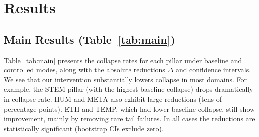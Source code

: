 \documentclass{article}
\begin{document}
\section{Results}
\subsection{Main Results (Table~\ref{tab:main})}
Table~\ref{tab:main} presents the collapse rates for each pillar under baseline and controlled modes, along with the absolute reductions $\Delta$ and confidence intervals. We see that our intervention substantially lowers collapse in most domains. For example, the STEM pillar (with the highest baseline collapse) drops dramatically in collapse rate. HUM and META also exhibit large reductions (tens of percentage points). ETH and TEMP, which had lower baseline collapse, still show improvement, mainly by removing rare tail failures. In all cases the reductions are statistically significant (bootstrap CIs exclude zero).

\begin{table}[t]
\centering
\scriptsize
\setlength{\tabcolsep}{2.5pt}
\caption{Collapse reduction across five pillars under baseline vs.\ controlled decoding (Gemma~7B, Ollama, 512 tokens fixed).
Rates show Wilson 95\% CIs; $\Delta$/RR/OR use paired bootstrap over seeds (B=20{,}000).}
\label{tab:main}
\end{table}
\end{document}
